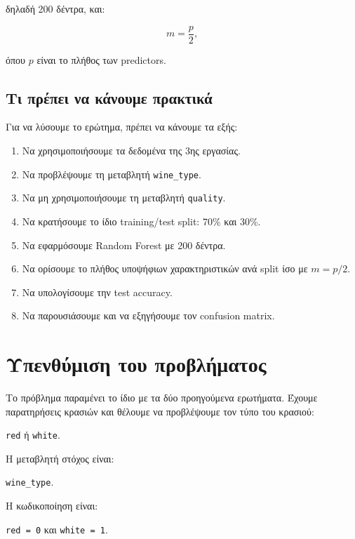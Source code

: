 \documentclass[12pt,a4paper]{article}
\newcommand{\code}[1]{\texttt{\textenglish{#1}}}
\begin{document}
δηλαδή 200 δέντρα, και:

\[
    m = \frac{p}{2},
\]

όπου $p$ είναι το πλήθος των predictors.

\subsection{Τι πρέπει να κάνουμε πρακτικά}

Για να λύσουμε το ερώτημα, πρέπει να κάνουμε τα εξής:

\begin{enumerate}[label=\arabic*.]
    \item Να χρησιμοποιήσουμε τα δεδομένα της 3ης εργασίας.
    \item Να προβλέψουμε τη μεταβλητή \code{wine\_type}.
    \item Να μη χρησιμοποιήσουμε τη μεταβλητή \code{quality}.
    \item Να κρατήσουμε το ίδιο training/test split: 70\% και 30\%.
    \item Να εφαρμόσουμε Random Forest με 200 δέντρα.
    \item Να ορίσουμε το πλήθος υποψήφιων χαρακτηριστικών ανά split ίσο με
    $m=p/2$.
    \item Να υπολογίσουμε την test accuracy.
    \item Να παρουσιάσουμε και να εξηγήσουμε τον confusion matrix.
\end{enumerate}

\section{Υπενθύμιση του προβλήματος}

Το πρόβλημα παραμένει το ίδιο με τα δύο προηγούμενα ερωτήματα. Έχουμε
παρατηρήσεις κρασιών και θέλουμε να προβλέψουμε τον τύπο του κρασιού:

\begin{center}
\code{red} ή \code{white}.
\end{center}

Η μεταβλητή στόχος είναι:

\begin{center}
\code{wine\_type}.
\end{center}

Η κωδικοποίηση είναι:

\begin{center}
\code{red = 0} \hspace{1cm} και \hspace{1cm} \code{white = 1}.
\end{center}
\end{document}
